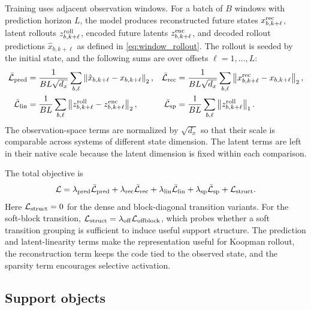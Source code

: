 \documentclass[11pt]{article}
\newcommand{\norm}[1]{\left\lVert #1 \right\rVert}
\begin{document}
Training uses adjacent observation windows. For a batch of $B$ windows with prediction horizon $L$, the model produces reconstructed future states $x_{b,k+\ell}^{\rm rec}$, latent rollouts $z_{b,k+\ell}^{\rm roll}$, encoded future latents $z_{b,k+\ell}^{\rm enc}$, and decoded rollout predictions $\hat x_{b,k+\ell}$ as defined in \cref{eq:window_rollout}. The rollout is seeded by the initial state, and the following sums are over offsets $\ell=1,\ldots,L$:
\begin{align}
  \bar{\mathcal{L}}_{\rm pred}
  &=\frac{1}{BL\sqrt{d_x}}\sum_{b,\ell}\norm{\hat{x}_{b,k+\ell}-x_{b,k+\ell}}_2,
  &
  \bar{\mathcal{L}}_{\rm rec}
  &=\frac{1}{BL\sqrt{d_x}}\sum_{b,\ell}\norm{x_{b,k+\ell}^{\rm rec}-x_{b,k+\ell}}_2,
  \label{eq:loss_state_terms}
  \\
  \bar{\mathcal{L}}_{\rm lin}
  &=\frac{1}{BL}\sum_{b,\ell}\norm{z_{b,k+\ell}^{\rm roll}-z_{b,k+\ell}^{\rm enc}}_2,
  &
  \bar{\mathcal{L}}_{\rm sp}
  &=\frac{1}{BL}\sum_{b,\ell}\norm{z_{b,k+\ell}^{\rm roll}}_1 .
  \label{eq:loss_latent_terms}
\end{align}
The observation-space terms are normalized by $\sqrt{d_x}$ so that their scale is comparable across systems of different state dimension. The latent terms are left in their native scale because the latent dimension is fixed within each comparison.

The total objective is
\begin{equation}
  \mathcal{L}
  =
  \lambda_{\rm pred}\bar{\mathcal{L}}_{\rm pred}
  +\lambda_{\rm rec}\bar{\mathcal{L}}_{\rm rec}
  +\lambda_{\rm lin}\bar{\mathcal{L}}_{\rm lin}
  +\lambda_{\rm sp}\bar{\mathcal{L}}_{\rm sp}
  +\mathcal{L}_{\rm struct}.
  \label{eq:training_objective}
\end{equation}
Here $\mathcal{L}_{\rm struct}=0$ for the dense and block-diagonal transition variants.
For the soft-block transition, $\mathcal{L}_{\rm struct}=\lambda_{\rm off}\mathcal{L}_{\rm offblock}$, which probes whether a soft transition grouping is sufficient to induce useful support structure.
The prediction and latent-linearity terms make the representation useful for Koopman rollout, the reconstruction term keeps the code tied to the observed state, and the sparsity term encourages selective activation.

\subsection{Support objects}
\label{sec:method_supports}
\end{document}
